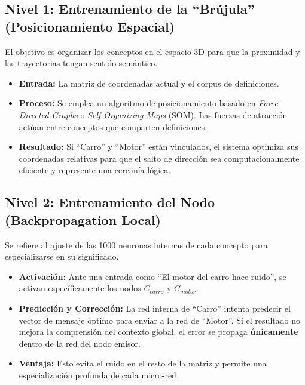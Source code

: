 \documentclass[12pt]{article}
\begin{document}
\subsection{Nivel 1: Entrenamiento de la ``Brújula'' (Posicionamiento Espacial)}
El objetivo es organizar los conceptos en el espacio 3D para que la proximidad y las trayectorias tengan sentido semántico.
\begin{itemize}
    \item \textbf{Entrada:} La matriz de coordenadas actual y el corpus de definiciones.
    \item \textbf{Proceso:} Se emplea un algoritmo de posicionamiento basado en \textit{Force-Directed Graphs} o \textit{Self-Organizing Maps} (SOM). Las fuerzas de atracción actúan entre conceptos que comparten definiciones.
    \item \textbf{Resultado:} Si ``Carro'' y ``Motor'' están vinculados, el sistema optimiza sus coordenadas relativas para que el salto de dirección sea computacionalmente eficiente y represente una cercanía lógica.
\end{itemize}



\subsection{Nivel 2: Entrenamiento del Nodo (Backpropagation Local)}
Se refiere al ajuste de las 1000 neuronas internas de cada concepto para especializarse en su significado.
\begin{itemize}
    \item \textbf{Activación:} Ante una entrada como ``El motor del carro hace ruido'', se activan específicamente los nodos $C_{carro}$ y $C_{motor}$.
    \item \textbf{Predicción y Corrección:} La red interna de ``Carro'' intenta predecir el vector de mensaje óptimo para enviar a la red de ``Motor''. Si el resultado no mejora la comprensión del contexto global, el error se propaga \textbf{únicamente} dentro de la red del nodo emisor.
    \item \textbf{Ventaja:} Esto evita el ruido en el resto de la matriz y permite una especialización profunda de cada micro-red.
\end{itemize}
\end{document}
